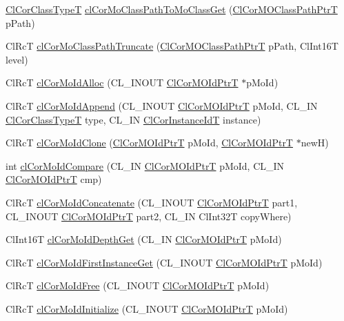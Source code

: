 \begin{CompactItemize}
\item 
\hyperlink{group__group13_ga2}{Cl\-Cor\-Class\-Type\-T} \hyperlink{group__group13_ga102}{cl\-Cor\-Mo\-Class\-Path\-To\-Mo\-Class\-Get} (\hyperlink{struct_cl_cor_m_o_class_path}{Cl\-Cor\-MOClass\-Path\-Ptr\-T} p\-Path)
\item 
Cl\-Rc\-T \hyperlink{group__group13_ga98}{cl\-Cor\-Mo\-Class\-Path\-Truncate} (\hyperlink{struct_cl_cor_m_o_class_path}{Cl\-Cor\-MOClass\-Path\-Ptr\-T} p\-Path, Cl\-Int16T level)
\item 
Cl\-Rc\-T \hyperlink{group__group13_ga108}{cl\-Cor\-Mo\-Id\-Alloc} (CL\_\-INOUT \hyperlink{struct_cl_cor_m_o_id}{Cl\-Cor\-MOId\-Ptr\-T} $\ast$p\-Mo\-Id)
\item 
Cl\-Rc\-T \hyperlink{group__group13_ga112}{cl\-Cor\-Mo\-Id\-Append} (CL\_\-INOUT \hyperlink{struct_cl_cor_m_o_id}{Cl\-Cor\-MOId\-Ptr\-T} p\-Mo\-Id, CL\_\-IN \hyperlink{group__group13_ga2}{Cl\-Cor\-Class\-Type\-T} type, CL\_\-IN \hyperlink{group__group13_ga4}{Cl\-Cor\-Instance\-Id\-T} instance)
\item 
Cl\-Rc\-T \hyperlink{group__group13_ga123}{cl\-Cor\-Mo\-Id\-Clone} (\hyperlink{struct_cl_cor_m_o_id}{Cl\-Cor\-MOId\-Ptr\-T} p\-Mo\-Id, \hyperlink{struct_cl_cor_m_o_id}{Cl\-Cor\-MOId\-Ptr\-T} $\ast$new\-H)
\item 
int \hyperlink{group__group13_ga124}{cl\-Cor\-Mo\-Id\-Compare} (CL\_\-IN \hyperlink{struct_cl_cor_m_o_id}{Cl\-Cor\-MOId\-Ptr\-T} p\-Mo\-Id, CL\_\-IN \hyperlink{struct_cl_cor_m_o_id}{Cl\-Cor\-MOId\-Ptr\-T} cmp)
\item 
Cl\-Rc\-T \hyperlink{group__group13_ga129}{cl\-Cor\-Mo\-Id\-Concatenate} (CL\_\-INOUT \hyperlink{struct_cl_cor_m_o_id}{Cl\-Cor\-MOId\-Ptr\-T} part1, CL\_\-INOUT \hyperlink{struct_cl_cor_m_o_id}{Cl\-Cor\-MOId\-Ptr\-T} part2, CL\_\-IN Cl\-Int32T copy\-Where)
\item 
Cl\-Int16T \hyperlink{group__group13_ga113}{cl\-Cor\-Mo\-Id\-Depth\-Get} (CL\_\-IN \hyperlink{struct_cl_cor_m_o_id}{Cl\-Cor\-MOId\-Ptr\-T} p\-Mo\-Id)
\item 
Cl\-Rc\-T \hyperlink{group__group13_ga118}{cl\-Cor\-Mo\-Id\-First\-Instance\-Get} (CL\_\-INOUT \hyperlink{struct_cl_cor_m_o_id}{Cl\-Cor\-MOId\-Ptr\-T} p\-Mo\-Id)
\item 
Cl\-Rc\-T \hyperlink{group__group13_ga109}{cl\-Cor\-Mo\-Id\-Free} (CL\_\-INOUT \hyperlink{struct_cl_cor_m_o_id}{Cl\-Cor\-MOId\-Ptr\-T} p\-Mo\-Id)
\item 
Cl\-Rc\-T \hyperlink{group__group13_ga107}{cl\-Cor\-Mo\-Id\-Initialize} (CL\_\-INOUT \hyperlink{struct_cl_cor_m_o_id}{Cl\-Cor\-MOId\-Ptr\-T} p\-Mo\-Id)

\end{CompactItemize}
